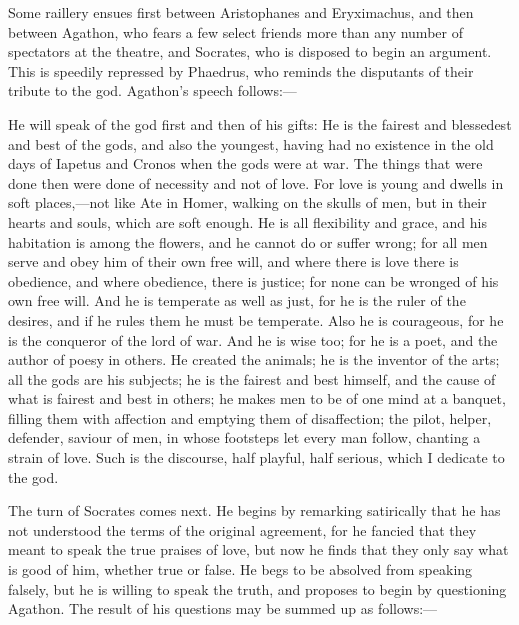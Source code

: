 \documentclass[11pt,letter]{article}
\begin{document}
\par  Some raillery ensues first between Aristophanes and Eryximachus, and then between Agathon, who fears a few select friends more than any number of spectators at the theatre, and Socrates, who is disposed to begin an argument. This is speedily repressed by Phaedrus, who reminds the disputants of their tribute to the god. Agathon's speech follows:—

\par  He will speak of the god first and then of his gifts: He is the fairest and blessedest and best of the gods, and also the youngest, having had no existence in the old days of Iapetus and Cronos when the gods were at war. The things that were done then were done of necessity and not of love. For love is young and dwells in soft places,—not like Ate in Homer, walking on the skulls of men, but in their hearts and souls, which are soft enough. He is all flexibility and grace, and his habitation is among the flowers, and he cannot do or suffer wrong; for all men serve and obey him of their own free will, and where there is love there is obedience, and where obedience, there is justice; for none can be wronged of his own free will. And he is temperate as well as just, for he is the ruler of the desires, and if he rules them he must be temperate. Also he is courageous, for he is the conqueror of the lord of war. And he is wise too; for he is a poet, and the author of poesy in others. He created the animals; he is the inventor of the arts; all the gods are his subjects; he is the fairest and best himself, and the cause of what is fairest and best in others; he makes men to be of one mind at a banquet, filling them with affection and emptying them of disaffection; the pilot, helper, defender, saviour of men, in whose footsteps let every man follow, chanting a strain of love. Such is the discourse, half playful, half serious, which I dedicate to the god.

\par  The turn of Socrates comes next. He begins by remarking satirically that he has not understood the terms of the original agreement, for he fancied that they meant to speak the true praises of love, but now he finds that they only say what is good of him, whether true or false. He begs to be absolved from speaking falsely, but he is willing to speak the truth, and proposes to begin by questioning Agathon. The result of his questions may be summed up as follows:—
\end{document}
